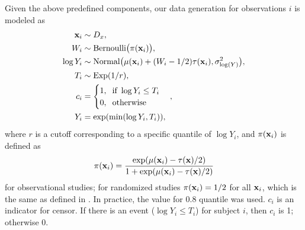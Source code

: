     Given the above predefined components, our data generation for  observations $i$ is modeled as
    \begin{equation*}
      \begin{split}
        \mathbf{x}_i & \sim D_x, \\
        W_i & \sim \mathrm{Bernoulli}\big( \pi(\mathbf{x}_i) \big), \\
        \log Y_i & \sim \mathrm{Normal} \big( \mu(\mathbf{x}_i) + (W_i - 1/2) \tau(\mathbf{x}_i), \sigma_{\log(Y)}^2  \big), \\
        T_i & \sim \mathrm{Exp}(1/r),\\
        c_i & = \begin{cases} 1, \hspace{0.2cm} \text{if } \log Y_i \leq T_i \\ 0, \hspace{0.2cm} \text{otherwise } \end{cases}, \\
        Y_i & = \exp( \min(\log Y_i, T_i) ),
      \end{split}
    \end{equation*}
    where $r$ is a cutoff corresponding to a specific quantile of $\log Y_i$, and $\pi(\mathbf{x}_i)$ is defined as
    \begin{equation}
      \label{eqn:ite_pi}
      \pi(\mathbf{x}_i) = \frac{\exp(\mu(\mathbf{x}_i) - \tau(\mathbf{x})/2)}{1 + \exp(\mu(\mathbf{x}_i) - \tau(\mathbf{x})/2)} 
    \end{equation}
    for observational studies; for randomized studies $\pi(\mathbf{x}_i) = 1/2$ for all $\mathbf{x}_i$, which is the same as defined in \cite{powers2017some}. In practice, the value for 0.8 quantile  was used. $c_i$ is an indicator for censor. If there is an event ($\log Y_i \leq T_i$) for subject $i$, then $c_i$ is 1; otherwise 0.
    
